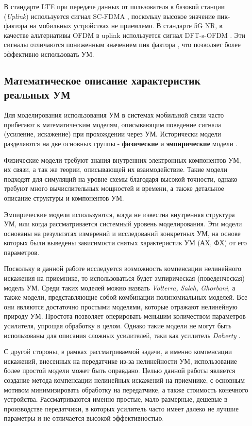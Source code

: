 В стандарте LTE при передаче данных от пользователя к базовой станции
(\textit{Uplink}) используется сигнал SC-FDMA \cite{3gpp.36.211}, поскольку
высокое значение пик-фактора на мобильных устройствах не приемлемо. В
стандарте 5G NR, в качестве альтернативы OFDM в uplink используется сигнал
DFT-s-OFDM \cite{3gpp.38.300}. Эти сигналы отличаются пониженным значением
пик фактора \cite{Vaigandla2021}, что позволяет более эффективно
использовать УМ.


\subsection{Математическое описание характеристик реальных УМ}

Для моделирования использования УМ в системах мобильной связи часто прибегают к
математическим моделям, описывающим поведение сигнала (усиление, искажение) при 
прохождении через УМ. Исторически модели разделяются на две основных
группы - \textbf{физические} и \textbf{эмпирические} модели \cite{cambridge2008}.

Физические модели требуют знания внутренних электронных компонентов УМ, их
связи, а так же теории, описывающей их взаимодействие. Такие модели подходят
для симуляций на уровне схемы благодаря высокой точности, однако требуют
много вычислительных мощностей и времени, а также детальное описание
структуры и компонентов УМ.

Эмпирические модели используются, когда не известна внутренняя структура УМ,
или когда рассматривается системный уровень моделирования. Эти модели
основаны на результатах измерений и исследований конкретных УМ, на основе
которых были выведены зависимости снятых характеристик УМ (АХ, ФХ) от его
параметров.

Поскольку в данной работе исследуется возможность компенсации нелинейного
искажения на приемнике, то использоваться будет эмпирическая
(поведенческая) модель УМ. Среди таких моделей можно назвать
\textit{Volterra, Saleh, Ghorbani}, а также модели, представляющие собой комбинации
полиномиальных моделей. Все они являются достаточно простыми моделями,
которые отражают нелинейную природу УМ. Простота позволяет оперировать
меньшим количеством параметров усилителя, упрощая обработку в целом. Однако
такие модели не могут быть использованы для описания сложных усилителей,
таки как усилитель \textit{Doherty} \cite{Doherty1936}\cite{3gpp.38.803}.

С другой стороны, в рамках рассматриваемой задачи, а именно компенсации
искажений, внесенных на передатчике из-за нелинейности УМ, использование
более простой модели может быть оправдано. Целью данной работы является
создание метода компенсации нелинейных искажений на приемнике, с основным
мотивом минимизировать обработку на передатчике, а также стоимость
конечного устройства. Рассматриваются именно простые, мало размерные,
дешевые в производстве передатчики, в которых усилитель часто имеет далеко
не лучшие параметры и не отличается высокой эффективностью.

